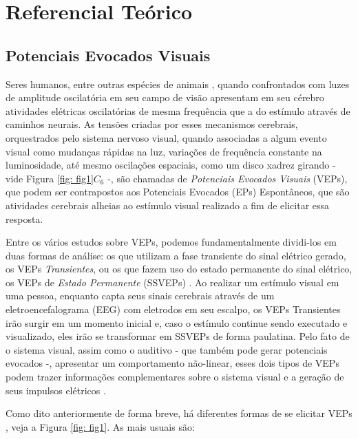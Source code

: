 \chapter[Referencial Teórico]{Referencial Teórico}

\section{Potenciais Evocados Visuais}

Seres humanos, entre outras espécies de animais \cite{Rager1998}, quando confrontados com luzes de amplitude oscilatória em seu campo de visão apresentam em seu cérebro atividades elétricas oscilatórias de mesma frequência que a do estímulo \cite{Regan1986} através de caminhos neurais. As tensões criadas por esses mecanismos cerebrais, orquestrados pelo sistema nervoso visual, quando associadas a algum evento visual como mudanças rápidas na luz, variações de frequência constante na luminosidade, até mesmo oscilações espaciais, como um disco xadrez girando \cite{hanHighlyInteractiveBrain2018} - vide Figura \autoref{fig: fig1}$C_6$ -, são chamadas de \textit{Potenciais Evocados Visuais} (VEPs), que podem ser contrapostos aos Potenciais Evocados (EPs) Espontâneos, que são atividades cerebrais alheias ao estímulo visual realizado a fim de elicitar essa resposta.

Entre os vários estudos sobre VEPs, podemos fundamentalmente dividi-los em duas formas de análise: os que utilizam a fase transiente do sinal elétrico gerado, os VEPs \textit{Transientes}, ou os que fazem uso do estado permanente do sinal elétrico, os VEPs de \textit{Estado Permanente} (SSVEPs) \cite{Regan1982}. Ao realizar um estímulo visual em uma pessoa, enquanto capta seus sinais cerebrais através de um eletroencefalograma (EEG) com eletrodos em seu escalpo, os VEPs Transientes irão surgir em um momento inicial e, caso o estímulo continue sendo executado e visualizado, eles irão se transformar em SSVEPs de forma paulatina. Pelo fato de o sistema visual, assim como o auditivo - que também pode gerar potenciais evocados \cite{John2000} -, apresentar um comportamento não-linear, esses dois tipos de VEPs podem trazer informações complementares sobre o sistema visual e a geração de seus impulsos elétricos \cite{Regan1982}. 

Como dito anteriormente de forma breve, há diferentes formas de se elicitar VEPs \cite{odom2004, Vialatte2010}, veja a Figura \autoref{fig: fig1}. As mais usuais são:  

